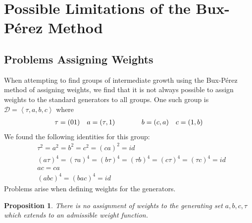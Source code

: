 \documentclass[11pt]{amsart}
\newtheorem{proposition}[theorem]{Proposition}
\theoremstyle{definition}
\theoremstyle{remark}
\numberwithin{equation}{section}
\begin{document}
\section{Possible Limitations of the Bux-P\'{e}rez Method}

\subsection{Problems Assigning Weights}

When attempting to find groups of intermediate growth using the Bux-P\'{e}rez method of assigning weights, we find that it is not always possible to assign weights to the standard generators to all groups. One such group is $\mathcal{D}=\left\langle \tau,a,b,c\right\rangle$ where 
\begin{align*}
& \tau=(01)
& a=(\tau,1)\hspace{1.35cm}
& b=(c,a)
& c=(1,b)
\end{align*}
We found the following identities for this group:
\begin{align*}
& \tau^2=a^2=b^2=c^2=(ca)^2=id\\
& (a\tau)^4=(\tau a)^4=(b\tau)^4=(\tau b)^4=(c\tau)^4=(\tau c)^4=id\\
& ac=ca\\
& (abc)^4=(bac)^4=id
\end{align*}
Problems arise when defining weights for the generators.  

\begin{proposition}
There is no assignment of weights to the generating set ${a,b,c,\tau}$ which extends to an admissible weight function.
\end{proposition}
\end{document}
